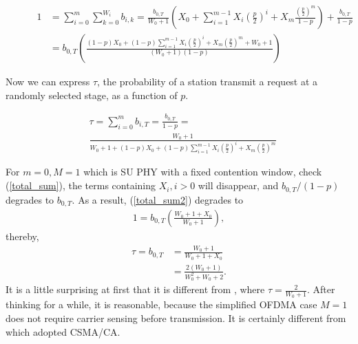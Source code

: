 \documentclass[journal]{IEEEtran}
\newcounter{MYtempeqncnt}
\begin{document}
\begin{figure}[!t]
\begin{align}
1 &= \sum_{i=0}^m \sum_{k=0}^{W_i}b_{i,k} 
 = \frac{b_{0,T}}{W_0+1}\left( X_0 + \sum_{i=1}^{m-1}X_i\left( \frac{p}{2}\right)^i + X_m\frac{\left( \frac{p}{2}\right)^m}{1-p}\right) + \frac{b_{0,T}}{1-p}\label{total_sum}\\
& = b_{0,T}\left( \frac{(1-p)X_0+(1-p) \sum_{i=1}^{m-1}X_i\left( \frac{p}{2}\right)^i+X_m\left( \frac{p}{2}\right)^m+W_0+1}{(W_0+1)(1-p)}\right)\label{total_sum2}
\end{align}
\hrulefill
\end{figure}

Now we can express $\tau$, the probability of a station transmit a request at a randomly selected stage, as a function of $p$.

\begin{align}
\label{tau_general}
&\tau = \sum_{i=0}^m b_{i,T} = \frac{b_{0,T}}{1-p} = \nonumber \\
&\frac{W_0+1}{W_0+1+(1-p)X_0+(1-p) \sum_{i=1}^{m-1}X_i\left( \frac{p}{2}\right)^i+X_m\left( \frac{p}{2}\right)^m}
\end{align}

For $m=0, M=1$ which is SU PHY with a fixed contention window, check (\ref{total_sum}), the terms containing $X_i, i>0$ will disappear, and $b_{0,T}/(1-p)$ degrades to $b_{0,T}$.
As a result, (\ref{total_sum2}) degrades to 
\begin{align}
1 = b_{0,T}\left( \frac{W_0+1+X_0}{W_0+1}\right),
\end{align}
thereby, 
\begin{align}
\tau = b_{0,T} &= \frac{W_0+1}{W_0+1+X_0} \nonumber\\
				&= \frac{2(W_0+1)}{W_0^2+W_0+2}.
\label{tau_W0}
\end{align}
It is a little surprising at first that it is different from \cite{ho1996performance}, where $\tau=\frac{2}{W_0+1}$.
After thinking for a while, it is reasonable, because the simplified OFDMA case $M=1$ does not require carrier sensing before transmission.
It is certainly different from \cite{ho1996performance} which adopted CSMA/CA.

\end{document}
